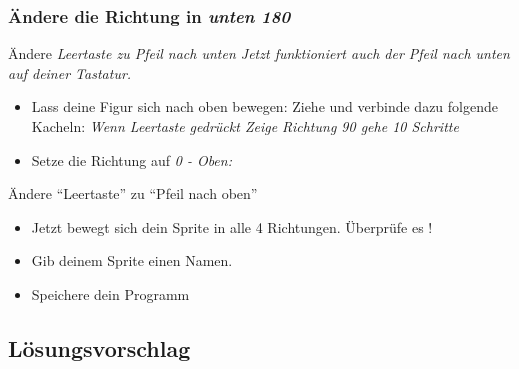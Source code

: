 \subsubsection{Ändere die Richtung in \it{unten 180}}
Ändere \it{Leertaste} zu \it{Pfeil nach unten}
Jetzt funktioniert auch der Pfeil nach unten auf deiner Tastatur. 
\begin{itemize}

\item Lass deine Figur sich nach oben bewegen: Ziehe und verbinde dazu folgende Kacheln:
\subitem \it{Wenn Leertaste gedrückt}
\subitem \it{Zeige Richtung 90}
\subitem \it{gehe 10 Schritte}
\item Setze die Richtung auf  \it{0 - Oben}:
\end{itemize}
Ändere “Leertaste” zu “Pfeil nach oben”

\begin{itemize}
\item Jetzt bewegt sich dein Sprite in alle 4 Richtungen. Überprüfe es !
\item Gib deinem Sprite einen Namen.
\item Speichere dein Programm
\end{itemize}
\subsection{Lösungsvorschlag}